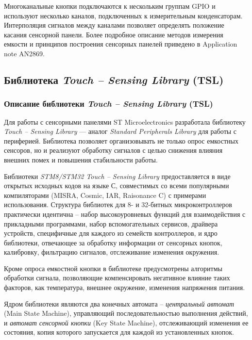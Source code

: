 Многоканальные кнопки подключаются к нескольким группам GPIO и используют несколько каналов, подключенных к измерительным конденсаторам. Интерполяция сигналов между каналами позволяет определять положение касания сенсорной панели. Более подробное описание методов измерения емкости и принципов построения сенсорных панелей приведено в Application note AN2869.

\subsection{Библиотека \textit{Touch --  Sensing Library} (TSL)}
\subsubsection{Описание библиотеки \textit{Touch --  Sensing Library} (TSL)}

Для работы с сенсорными панелями ST Microelectronics разработала библиотеку \textit{Touch --  Sensing Library} --- аналог \textit{Standard Peripherals Library} для работы с периферией. Библиотека позволяет организовывать не только опрос емкостных сенсоров, но и реализуют обработку сигналов с целью снижения влияния внешних помех и повышения стабильности работы. 
	
	 Библиотеки \textit{STM8/STM32 Touch --  Sensing Library} предоставляется в виде открытых исходных кодов на языке С, совместимых со всеми популярными компиляторами (MISRA, Cosmic, IAR, Raisonance C) с примерами использования. Структура библиотек для 8- и 32-битных микроконтроллеров практически идентична -- набор высокоуровневых функций для взаимодействия с прикладными программами, набор вспомогательных сервисов, драйвера устройств, специфичные для каждого из семейств контроллеров, и ядро библиотеки, отвечающее за обработку информации от сенсорных кнопок, калибровку, фильтрацию сигналов, отслеживание изменения окружения. 

Кроме опроса емкостной кнопки в библиотеке предусмотрены алгоритмы обработки сигнала, позволяющие компенсировать негативное влияние таких факторов, как температура, внешнее окружение, изменения напряжения питания. 
 	
 	Ядром библиотеки являются два конечных автомата -- \textit{центральный автомат} (Main State Machine), управляющий последовательностью выполнения действий, и \textit{автомат сенсорной кнопки} (Key State Machine), отслеживающий изменения ее состояния, копия которого запускается для каждой из установленных кнопок.



